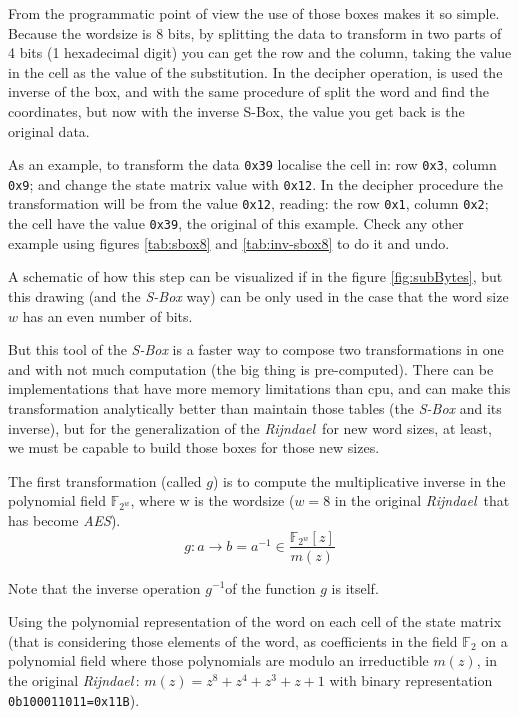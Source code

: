 \documentclass[10pt,a4paper,twoside]{llncs}
\newcommand{\rijndael}{\emph{Rijndael}}
\newcommand{\Fq}[1]{\ensuremath{\mathbb{F}_#1}}
\newcommand{\Fpn}[2]{\ensuremath{\mathbb{F}_{#1^#2}}}
\newcommand{\Fpnm}[2]{\ensuremath{\frac{\Fpn{2}{#1}[#2]}{m(#2)}}}
\begin{document}
From the programmatic point of view the use of those boxes makes it so simple. Because the wordsize is 8 bits, by splitting the data to transform in two parts of 4 bits (1 hexadecimal digit) you can get the row and the column, taking the value in the cell as the value of the substitution. In the decipher operation, is used the inverse of the box, and with the same procedure of split the word and find the coordinates, but now with the inverse S-Box, the value you get back is the original data.

As an example, to transform the data \texttt{0x39} localise the cell in: row \texttt{0x3}, column \texttt{0x9}; and change the state matrix value with \texttt{0x12}. In the decipher procedure the transformation will be from the value \texttt{0x12}, reading: the row \texttt{0x1}, column \texttt{0x2}; the cell have the value \texttt{0x39}, the original of this example. Check any other example using figures \ref{tab:sbox8} and \ref{tab:inv-sbox8} to do it and undo.

A schematic of how this step can be visualized if in the figure \ref{fig:subBytes}, but this drawing (and the \emph{S-Box} way) can be only used in the case that the word size $w$ has an even number of bits.


But this tool of the \emph{S-Box} is a faster way to compose two transformations in one and with not much computation (the big thing is pre-computed). There can be implementations that have more memory limitations than cpu, and can make this transformation analytically better than maintain those tables (the \emph{S-Box} and its inverse), but for the generalization of the \rijndael\, for new word sizes, at least, we must be capable to build those boxes for those new sizes.

The first transformation (called $g$) is to compute the multiplicative inverse in the polynomial field \Fpn{2}{w}, where w is the wordsize ($w=8$ in the original \rijndael\, that has become \emph{AES}).
\begin{equation}\label{eq:multInvPolyField}
 g:a\rightarrow b = a^{-1} \in \Fpnm{w}{z} 
\end{equation}

Note that the inverse operation $g^{-1}$of the function $g$ is itself.

Using the polynomial representation of the word on each cell of the state matrix (that is considering those elements of the word, as coefficients in the field \Fq{2} on a polynomial field where those polynomials are modulo an irreductible $m(z)$, in the original \rijndael\,: $m(z)=z^8+z^4+z^3+z+1$ with binary representation \texttt{0b100011011=0x11B}).
\end{document}
